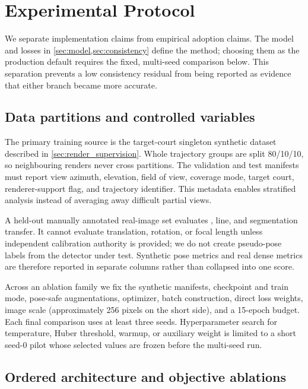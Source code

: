 \section{Experimental Protocol}
\label{sec:experiments}

We separate implementation claims from empirical adoption claims.  The model
and losses in \cref{sec:model,sec:consistency} define the method; choosing them
as the production default requires the fixed, multi-seed comparison below.
This separation prevents a low consistency residual from being reported as
evidence that either branch became more accurate.

\subsection{Data partitions and controlled variables}

The primary training source is the target-court singleton synthetic dataset
described in \cref{sec:render_supervision}.  Whole trajectory groups are split
80/10/10, so neighbouring renders never cross partitions.  The validation and
test manifests must report view azimuth, elevation, field of view, coverage
mode, target court, renderer-support flag, and trajectory identifier.  This
metadata enables stratified analysis instead of averaging away difficult
partial views.

A held-out manually annotated real-image set evaluates \KP, line, and
segmentation transfer.  It cannot evaluate translation, rotation, or focal
length unless independent calibration authority is provided; we do not create
pseudo-pose labels from the detector under test.  Synthetic pose metrics and
real dense metrics are therefore reported in separate columns rather than
collapsed into one score.

Across an ablation family we fix the synthetic manifests, \DINO{} checkpoint
and train mode, pose-safe augmentations, optimizer, batch construction, direct
loss weights, image scale (approximately 256 pixels on the short side), and a
15-epoch budget.  Each final comparison uses at least three seeds.  Hyperparameter
search for temperature, Huber threshold, warmup, or auxiliary weight is limited
to a short seed-0 pilot whose selected values are frozen before the multi-seed
run.

\subsection{Ordered architecture and objective ablations}

